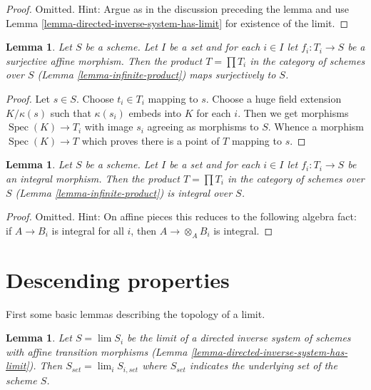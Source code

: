 \documentclass{stacks-project}
\theoremstyle{plain}
\newtheorem{lemma}[subsection]{Lemma}
\theoremstyle{definition}
\theoremstyle{remark}
\numberwithin{equation}{subsection}
\def\lim{\mathop{\mathrm{lim}}\nolimits}
\def\Spec{\mathop{\mathrm{Spec}}}
\begin{document}
\begin{proof}
Omitted. Hint: Argue as in the discussion preceding the lemma
and use Lemma \ref{lemma-directed-inverse-system-has-limit}
for existence of the limit.
\end{proof}

\begin{lemma}
\label{lemma-infinite-product-surjective}
Let $S$ be a scheme. Let $I$ be a set and for each $i \in I$
let $f_i : T_i \to S$ be a surjective affine morphism. Then the
product $T = \prod T_i$ in the category of schemes over $S$
(Lemma \ref{lemma-infinite-product})
maps surjectively to $S$.
\end{lemma}

\begin{proof}
Let $s \in S$. Choose $t_i \in T_i$ mapping to $s$.
Choose a huge field extension $K/\kappa(s)$ such that
$\kappa(s_i)$ embeds into $K$ for each $i$. Then we get
morphisms $\Spec(K) \to T_i$ with image $s_i$ agreeing
as morphisms to $S$. Whence a morphism $\Spec(K) \to T$
which proves there is a point of $T$ mapping to $s$.
\end{proof}

\begin{lemma}
\label{lemma-infinite-product-integral}
Let $S$ be a scheme. Let $I$ be a set and for each $i \in I$
let $f_i : T_i \to S$ be an integral morphism. Then the
product $T = \prod T_i$ in the category of schemes over $S$
(Lemma \ref{lemma-infinite-product})
is integral over $S$.
\end{lemma}

\begin{proof}
Omitted. Hint: On affine pieces this reduces to the following
algebra fact: if $A \to B_i$ is integral for all $i$, then
$A \to \otimes_A B_i$ is integral.
\end{proof}





\section{Descending properties}
\label{section-descent}

\noindent
First some basic lemmas describing the topology of a limit.

\begin{lemma}
\label{lemma-inverse-limit-sets}
Let $S = \lim S_i$ be the limit of a directed inverse system
of schemes with affine transition morphisms
(Lemma \ref{lemma-directed-inverse-system-has-limit}). Then
$S_{set} = \lim_i S_{i, set}$ where $S_{set}$
indicates the underlying set of the scheme $S$.
\end{lemma}
\end{document}

